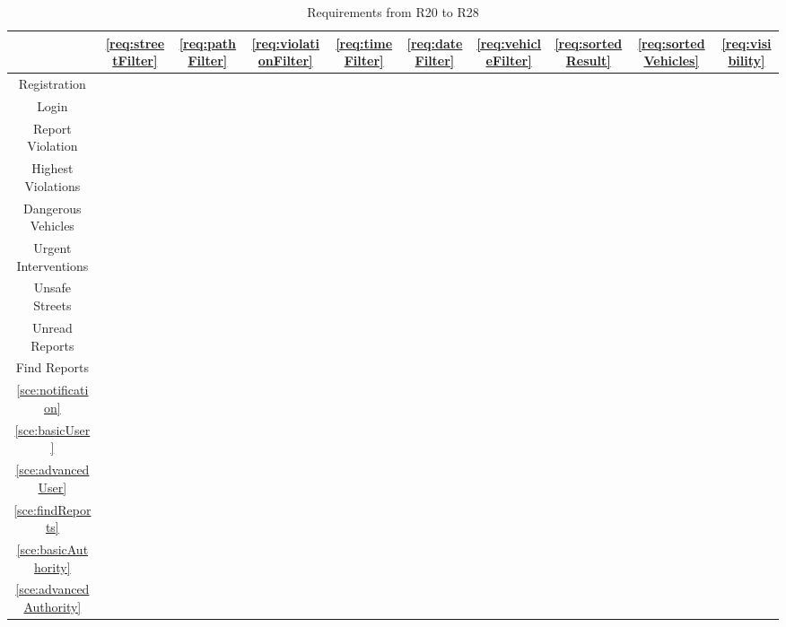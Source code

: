 		\begin{table}[h]
			\centering
			\begin{minipage}{0.5\textheight}
				\centering
				\begin{tabular}{|c|c|c|c|c|c|c|c|c|c|}
					\cline{2-10}
					\multicolumn{1}{c|}{} & \ref{req:streetFilter} & \ref{req:pathFilter} & \ref{req:violationFilter} & \ref{req:timeFilter} & \ref{req:dateFilter} & \ref{req:vehicleFilter} & \ref{req:sortedResult} & \ref{req:sortedVehicles} & \ref{req:visibility} \\
					\hline
					Registration & & & & & & & & &\\
					\hline
					Login & & & & & & & & &\\
					\hline
					Report Violation & & & & & & & & & \\
					\hline
					Highest Violations & & & \xmark & \xmark & & \xmark & \xmark & \xmark &\\
					\hline
					Dangerous Vehicles & & & \xmark & \xmark & & & \xmark & &\\
					\hline
					Urgent Interventions & \xmark & & & & & & & &\\
					\hline
					Unsafe Streets & \xmark & \xmark & & & & & & &\\
					\hline
					Unread Reports & & & & & & & & &\\
					\hline
					Find Reports & \xmark & & \xmark & \xmark & \xmark & \xmark & & & \xmark\\
					\hline
					\ref{sce:notification} & & & & & & & & & \\
					\hline
					\ref{sce:basicUser} & & & \xmark & \xmark & & \xmark & \xmark & &\\
					\hline
					\ref{sce:advancedUser} & \xmark & \xmark & & & & & & &\\
					\hline
					\ref{sce:findReports} & \xmark & & \xmark & \xmark & \xmark & \xmark & & & \xmark\\
					\hline
					\ref{sce:basicAuthority} & & & \xmark & \xmark & & \xmark & \xmark & &\\
					\hline
					\ref{sce:advancedAuthority} & \xmark & & & & & & & &\\
					\hline
				\end{tabular}
				\vspace{0.4cm}
				\caption{Requirements from R20 to R28}
			\end{minipage}
		\end{table}
	
		\vfill
		
